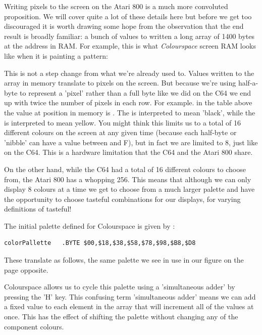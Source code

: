 

Writing pixels to the screen on the Atari 800 is a much more convoluted proposition. We will cover
quite a lot of these details here but before we get too discouraged it is worth drawing some hope
from the observation that the end result is broadly familiar: a bunch of values to written a long
array of 1400 bytes at the address  in RAM. For example, this is what \textit{Colourspace}
screen RAM looks like when it is painting a pattern:



This is not a step change from what we're already used to. Values written to the array in memory translate
to pixels on the screen. But because we're using half-a-byte to represent a 'pixel' rather than a full byte
like we did on the C64 we end up with twice the number of pixels in each row. For example. in the table above
the value at position  in memory is . The  is interpreted to mean 'black',
while the  is interpreted to mean yellow. You might think this limits us to a total of 16 different colours on the screen at
any given time (because each half-byte or 'nibble' can have a value between  and {F}), but in fact we
are limited to 8, just like on the C64. This is a hardware limitation that the C64 and the Atari 800 share.

On the other hand, while the C64 had a total of 16 different colours to choose from, the Atari 800 has a whopping
256. This means that although we can only display 8 colours at a time we get to choose from a much larger palette and
have the opportunity to choose tasteful combinations for our displays, for varying definitions of tasteful!




The initial palette defined for Colourspace is given by :
\begin{lstlisting}
colorPallette   .BYTE $00,$18,$38,$58,$78,$98,$B8,$D8
\end{lstlisting}

These translate as follows, the same palette we see in use in our figure on the page opposite.


Colourspace allows us to cycle this palette using a 'simultaneous adder' by pressing the 'H' key. This confusing term 'simultaneous
adder' means we can add
a fixed value to each element in the array that will increment all of the values at once. This has the effect
of shifting the palette without changing any of the component colours.

